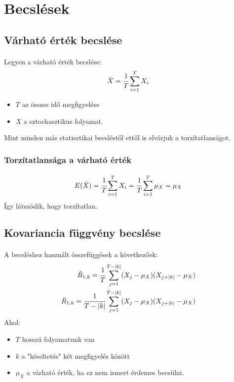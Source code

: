 \documentclass[11pt,a4pape,draftr]{article}
\begin{document}
		\section{Becslések}
			\subsection{Várható érték becslése}
				\paragraph{}
					Legyen a várható érték becslése:
					$$\bar{X} = \cfrac{1}{T} \sum_{i = 1}^{T}X_i$$
					\begin{itemize}
						\item $T$ az összes idő megfigyelése
						\item $X$ a sztochasztikus folyamat.
					\end{itemize}
					Mint minden más statisztikai becsléstől ettől is elvárjuk a torzítatlanságot.
				\subsubsection{Torzítatlansága a várható érték}
					\paragraph{}
						$$E(\bar{X}) = \cfrac{1}{T} \sum_{i = 1}^{T}X_i = \cfrac{1}{T} \sum_{i=1}^T \mu_X = \mu_X$$
						Így látszódik, hogy torzítatlan.
			\subsection{Kovariancia függvény becslése}
				\paragraph{}
					A becsléshez használt összefüggések a következőek:
					$$
					\begin{aligned}
						\hat{R}_{1,k} = \cfrac{1}{T}\sum_{j=1}^{T -|k|}(X_j - \mu_X)(X_{j+|k|} -\mu_X) \\
						\bar{R}_{1,k} = \cfrac{1}{T-|k|} \sum_{j=1}^{T - |k|}(X_j - \mu_X)(X_{j+ |k|} - \mu_X) 
					\end{aligned}$$
					Ahol:
					\begin{itemize}
						\item $T$ hosszú folyamatunk van
						\item $k$ a "késeltetés" két megfigyelés között
						\item $\mu_X$ a várható érték, ha ez nem ismert érdemes becsülni.
					\end{itemize}
\end{document}
